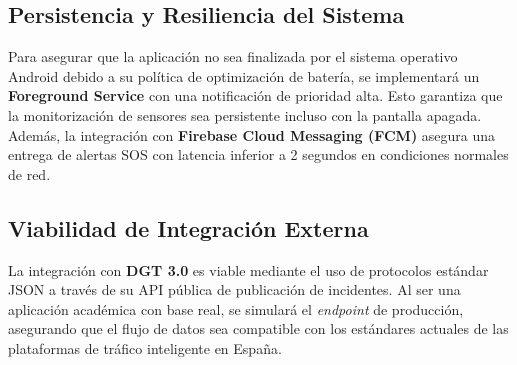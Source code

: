 \documentclass[11pt, a4paper]{article}
\begin{document}
    \subsection{Persistencia y Resiliencia del Sistema}
    Para asegurar que la aplicación no sea finalizada por el sistema operativo Android debido a su política de optimización de batería, se implementará un \textbf{Foreground Service} con una notificación de prioridad alta. Esto garantiza que la monitorización de sensores sea persistente incluso con la pantalla apagada. Además, la integración con \textbf{Firebase Cloud Messaging (FCM)} asegura una entrega de alertas SOS con latencia inferior a 2 segundos en condiciones normales de red.

    \subsection{Viabilidad de Integración Externa}
    La integración con \textbf{DGT 3.0} es viable mediante el uso de protocolos estándar JSON a través de su API pública de publicación de incidentes. Al ser una aplicación académica con base real, se simulará el \textit{endpoint} de producción, asegurando que el flujo de datos sea compatible con los estándares actuales de las plataformas de tráfico inteligente en España.
\end{document}
